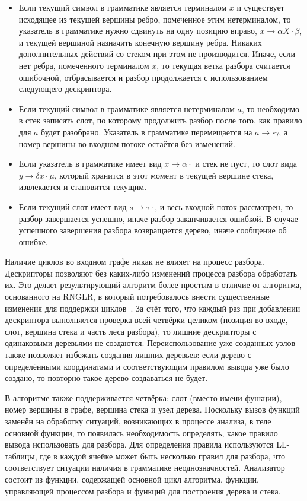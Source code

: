 \begin{itemize}
\item Если текущий символ в грамматике является терминалом $x$ и существует исходящее из текущей вершины ребро, помеченное этим нетерминалом, то указатель в грамматике нужно сдвинуть на одну позицию вправо, $x \rightarrow \alpha X \cdot \beta$, и текущей вершиной назначить конечную вершину ребра. Никаких дополнительных действий со стеком при этом не производится. Иначе, если нет ребра, помеченного терминалом $x$, то текущая ветка разбора считается ошибочной, отбрасывается и  разбор продолжается с использованием следующего дескриптора.
\item Если текущий символ в грамматике является нетерминалом $a$, то необходимо в стек записать слот, по которому продолжить разбор после того, как правило для $a$ будет разобрано. Указатель в грамматике перемещается на $a \rightarrow \cdot \gamma $, а номер вершины во входном потоке остаётся без изменений.
\item Если указатель в грамматике имеет вид $x \rightarrow \alpha\cdot$ и стек не пуст, то слот вида $y \rightarrow \delta x \cdot \mu$, который хранится в этот момент в текущей вершине стека, извлекается и становится текущим.
\item Если текущий слот имеет вид $s \rightarrow \tau\cdot$, и весь входной поток рассмотрен, то разбор завершается успешно, иначе разбор заканчивается ошибкой. В случае успешного завершения разбора возвращается дерево, иначе сообщение об ошибке.
\end{itemize}

Наличие циклов во входном графе никак не влияет на процесс разбора. Дескрипторы позволяют без каких-либо изменений процесса разбора обработать их. Это делает результирующий алгоритм более простым в отличие от алгоритма, основанного на RNGLR, в который потребовалось внести существенные изменения для поддержки циклов~\cite{RelaxedARNGLR}. За счёт того, что каждый раз при добавлении дескриптора выполняется проверка всей четвёрки целиком (позиция во входе, слот, вершина стека и часть леса разбора), то лишние дескрипторы с одинаковыми деревьями не создаются. Переиспользование уже созданных узлов также позволяет избежать создания лишних деревьев: если дерево с определёнными координатами и соответствующим правилом вывода уже было создано, то повторно такое дерево создаваться не будет.

В алгоритме также поддерживается четвёрка: слот (вместо имени функции), номер вершины в графе, вершина стека и узел дерева. Поскольку вызов функций заменён на обработку ситуаций, возникающих в процессе анализа, в теле основной функции, то появилась необходимость определять, какое правило вывода использовать для разбора. Для определения правила используются LL-таблицы, где в каждой ячейке может быть несколько правил для разбора, что соответствует ситуации наличия в грамматике неоднозначностей. Анализатор состоит из функции, содержащей основной цикл алгоритма, функции, управляющей процессом разбора и функций для построения дерева и стека.

